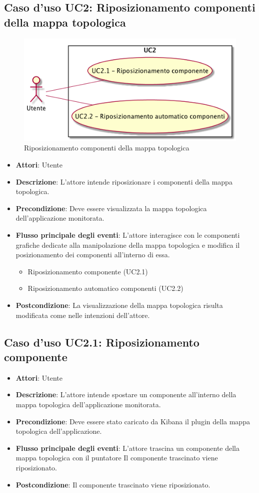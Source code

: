  \hypertarget{UC2}{}
\subsection{Caso d'uso UC2: Riposizionamento componenti della mappa topologica}
\begin{figure} [H]
	\centering
	\includegraphics[scale=0.45]{./UC/UC2.png}
	\caption{Riposizionamento componenti della mappa topologica}\label{}
\end{figure}
\begin{itemize}
	\item \textbf{Attori}: Utente
	\item \textbf{Descrizione}: L'attore intende riposizionare i componenti della mappa topologica.
	\item \textbf{Precondizione}: Deve essere visualizzata la mappa topologica dell'applicazione monitorata.
	\item \textbf{Flusso principale degli eventi}: L'attore interagisce con le componenti grafiche dedicate alla manipolazione della mappa topologica e modifica il posizionamento dei componenti all'interno di essa.
	\begin{itemize}
		\item Riposizionamento componente (UC2.1)
		\item Riposizionamento automatico componenti (UC2.2)
	\end{itemize}
	\item \textbf{Postcondizione}: La visualizzazione della mappa topologica risulta modificata come nelle intenzioni dell'attore.
\end{itemize}
\subsection{Caso d'uso UC2.1: Riposizionamento componente}
\begin{itemize}
	\item \textbf{Attori}: Utente
	\item \textbf{Descrizione}: L'attore intende spostare un componente all'interno della mappa topologica dell'applicazione monitorata.
	\item \textbf{Precondizione}: Deve essere stato caricato da Kibana il plugin della mappa topologica dell'applicazione.
	\item \textbf{Flusso principale degli eventi}: L'attore trascina un componente della mappa topologica con il puntatore Il componente trascinato viene riposizionato.
	\item \textbf{Postcondizione}: Il componente trascinato viene riposizionato.
\end{itemize}

